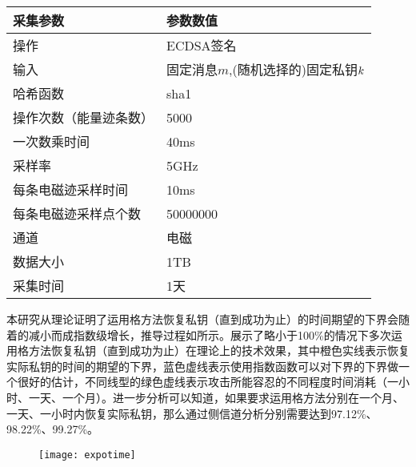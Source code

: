 {	
	
	\begin{table}[!h]
		\label{tab:acquisitionpara}
		\centering
		\begin{tabular}{ll}                                                               
			\hline   
			采集参数&参数数值\\                                                          
			\hline
			操作 & ECDSA签名\\
			输入 & 固定消息$m$,(随机选择的)固定私钥$k$\\
			哈希函数& sha1\citep{FIPS180-4}\\
			操作次数（能量迹条数） & 5000\\
			一次数乘时间 & 40ms\\
			采样率 & 5GHz\\
			每条电磁迹采样时间 & 10ms\\
			每条电磁迹采样点个数 & 50000000\\
			通道 & 电磁\\
			数据大小 & 1TB\\
			采集时间 & 1天\\
			\hline
		\end{tabular}
	\end{table}

	
	本研究从理论证明了运用格方法恢复私钥（直到成功为止）的时间期望的下界会随着\zyx 的减小而成指数级增长，推导过程如所示。展示了\zyx 略小于100\%的情况下多次运用格方法恢复私钥（直到成功为止）在理论上的技术效果，其中橙色实线表示恢复实际私钥的时间的期望的下界，蓝色虚线表示使用指数函数可以对下界的下界做一个很好的估计，不同线型的绿色虚线表示攻击所能容忍的不同程度时间消耗（一小时、一天、一个月）。进一步分析可以知道，如果要求运用格方法分别在一个月、一天、一小时内恢复实际私钥，那么通过侧信道分析\zyx 分别需要达到97.12\%、98.22\%、99.27\%。
	
	\begin{figure}[!h]
		\begin{center}
			\texttt{[image: expotime]}
			\label{fig:expotime}
		\end{center}
	\end{figure}

}
